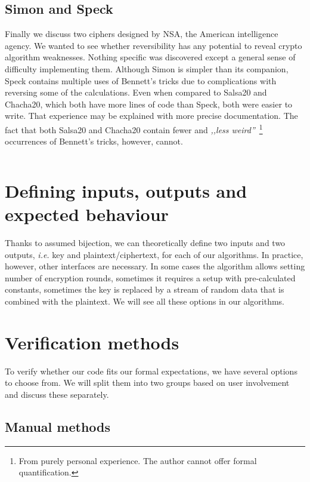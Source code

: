 \documentclass[a4paper,10pt,openright]{memoir}
\newcommand{\ie}{\emph{i.e.}\xspace}
\begin{document}
\subsection{Simon and Speck}

Finally we discuss two ciphers designed by NSA, the American 
intelligence agency. We wanted to see whether reversibility has any 
potential to reveal crypto algorithm weaknesses. Nothing specific was 
discovered except a general sense of difficulty implementing them. 
Although Simon is simpler than its companion, Speck contains multiple 
uses of Bennett's tricks due to complications with reversing some of 
the calculations. Even when compared to Salsa20 and Chacha20, which 
both have more lines of code than Speck, both were easier to write. 
That experience may be explained with more precise documentation. The 
fact that both Salsa20 and Chacha20 contain fewer and \textit{,,less 
weird''}~\footnote{From purely personal experience. The author cannot 
offer formal quantification.} occurrences of Bennett's tricks, however, 
cannot.

\begin{lstlisting}
\end{lstlisting}


\section{Defining inputs, outputs and expected behaviour}

Thanks to assumed bijection, we can theoretically define two inputs and 
two outputs, \ie key and plaintext/ciphertext, for each of our 
algorithms. In practice, however, other interfaces are necessary. In 
some cases the algorithm allows setting number of encryption rounds, 
sometimes it requires a setup with pre-calculated constants, sometimes 
the key is replaced by a stream of random data that is combined with 
the plaintext. We will see all these options in our algorithms.

\section{Verification methods}

To verify whether our code fits our formal expectations, we have 
several options to choose from. We will split them into two groups 
based on user involvement and discuss these separately.

\subsection{Manual methods}
\end{document}
